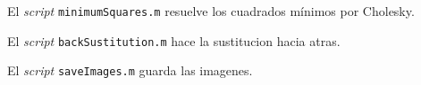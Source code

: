 \documentclass{article}
\begin{document}
\par El \textit{script} \verb+minimumSquares.m+ resuelve los cuadrados mínimos por Cholesky.

\begin{ttfamily}
\begin{center}
\end{center}
\end{ttfamily}

\par El \textit{script} \verb+backSustitution.m+ hace la sustitucion hacia atras.

\begin{ttfamily}
\begin{center}
\end{center}
\end{ttfamily}


\par El \textit{script} \verb+saveImages.m+ guarda las imagenes.

\begin{ttfamily}
\begin{center}
\end{center}
\end{ttfamily}
\end{document}
